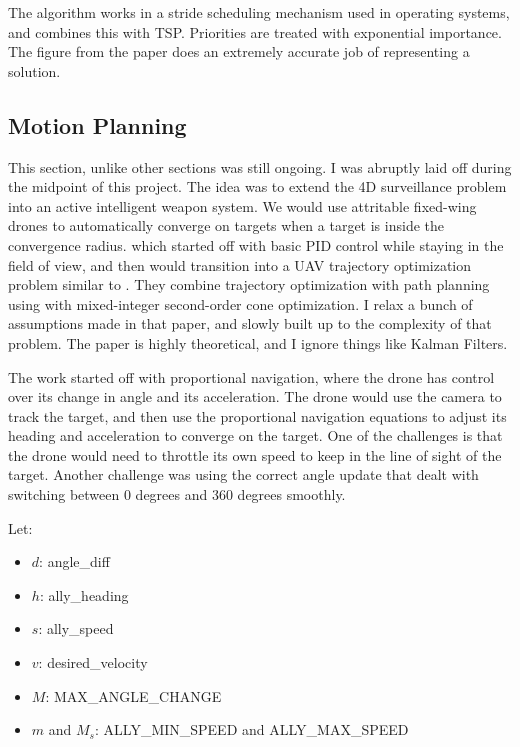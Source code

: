 \documentclass[12pt]{article}
\begin{document}
The algorithm works in a stride scheduling mechanism used in operating systems, and combines this with TSP. Priorities are treated with exponential importance. The figure from the paper does an extremely accurate job of representing a solution. 
\cite{alamdariPersistentMonitoringDiscrete2012}
\subsection{Motion Planning}
This section, unlike other sections was still ongoing. I was abruptly laid off during the midpoint of this project. The idea was to extend the 4D surveillance problem into an active intelligent weapon system. We would use attritable fixed-wing drones to automatically converge on targets when a target is inside the convergence radius. which started off with basic PID control while staying in the field of view, and then would transition into a UAV trajectory optimization problem similar to \cite{marcucciMotionPlanningObstacles2022}. They combine trajectory optimization with path planning using with mixed-integer second-order cone optimization. I relax a bunch of assumptions made in that paper, and slowly built up to the complexity of that problem. The paper is highly theoretical, and I ignore things like Kalman Filters.

The work started off with proportional navigation, where the drone has control over its change in angle and its acceleration. The drone would use the camera to track the target, and then use the proportional navigation equations to adjust its heading and acceleration to converge on the target. One of the challenges is that the drone would need to throttle its own speed to keep in the line of sight of the target. Another challenge was using the correct angle update that dealt with switching between 0 degrees and 360 degrees smoothly.

Let:
\begin{itemize}
    \item \( d \): angle\_diff
    \item \( h \): ally\_heading
    \item \( s \): ally\_speed
    \item \( v \): desired\_velocity
    \item \( M \): MAX\_ANGLE\_CHANGE
    \item \( m \) and \( M_s \): ALLY\_MIN\_SPEED and ALLY\_MAX\_SPEED
\end{itemize}
\end{document}
